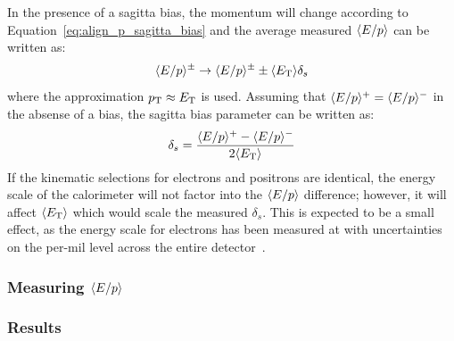 In the presence of a sagitta bias, the momentum will change according to Equation~\ref{eq:align_p_sagitta_bias} and the average measured $\langle E/p\rangle$ can be written as:
\begin{equation}
  \langle E/p\rangle^{\pm}\rightarrow\langle E/p\rangle^{\pm}\pm\langle E_{\mathrm{T}}\rangle\delta_s
\end{equation}
where the approximation $p_{\mathrm{T}}\approx E_{\mathrm{T}}$ is used.
Assuming that $\langle E/p\rangle^+ = \langle E/p\rangle^-$ in the absense of a bias, the sagitta bias parameter can be written as:
\begin{equation}
  \delta_s = \frac{\eop^+ - \eop^-}{2\langle\et\rangle}
\label{eq:align_eop_sagitta}
\end{equation}
If the kinematic selections for electrons and positrons are identical, the energy scale of the calorimeter will not factor into the $\langle E/p\rangle$ difference; however, it will affect $\langle E_{\mathrm{T}}\rangle$ which would scale the measured $\delta_s$.
This is expected to be a small effect, as the energy scale for electrons has been measured at  with uncertainties on the per-mil level across the entire detector~\cite{2016.electron-photon-calibration}.

\subsubsection{Measuring $\langle E/p\rangle$}

\subsubsection{Results}

